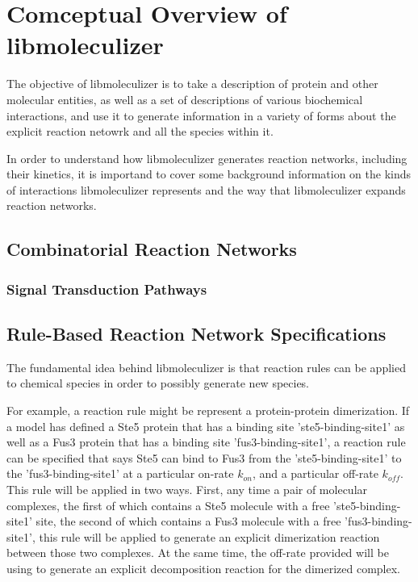 \chapter{Comceptual Overview of libmoleculizer}

The objective of libmoleculizer is to take a description of protein
and other molecular entities, as well as a set of descriptions of
various biochemical interactions, and use it to generate information
in a variety of forms about the explicit reaction netowrk and all the
species within it.  

In order to understand how libmoleculizer generates reaction networks,
including their kinetics, it is importand to cover some background
information on the kinds of interactions libmoleculizer represents and
the way that libmoleculizer expands reaction networks. 

\section{Combinatorial Reaction Networks}

\subsection{Signal Transduction Pathways}

\section{Rule-Based Reaction  Network Specifications}

The fundamental idea behind libmoleculizer is that reaction rules can
be applied to chemical species in order to possibly generate new
species.  

For example, a reaction rule might be represent a protein-protein
dimerization.  If a model has defined a Ste5 protein that has a
binding site 'ste5-binding-site1' as well as a Fus3 protein that has a
binding site 'fus3-binding-site1', a reaction rule can be specified
that says Ste5 can bind to Fus3 from the 'ste5-binding-site1' to the
'fus3-binding-site1' at a particular on-rate $k_{on}$, and a particular
off-rate $k_{off}$.  This rule will be applied in two ways.  First,
any time a pair of molecular complexes, the first of which contains a
Ste5 molecule with a free 'ste5-binding-site1' site, the second of which
contains a Fus3 molecule with a free 'fus3-binding-site1', this rule
will be applied to generate an explicit dimerization reaction between
those two complexes.  At the same time, the off-rate provided will be
using to generate an explicit decomposition reaction for the dimerized
complex.  


